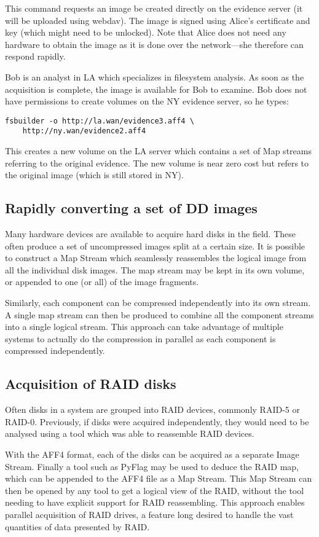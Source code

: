 \documentclass[10pt, conference]{IEEEtran}
\begin{document}
{{This command requests an image be created directly on the evidence
server (it will be uploaded using webdav). The image is signed using
Alice's certificate and key (which might need to be unlocked). Note
that Alice does not need any hardware to obtain the image as it is
done over the network---she therefore can respond rapidly.

Bob is an analyst in LA which specializes in filesystem analysis. As
soon as the acquisition is complete, the image is available for Bob to
examine. Bob does not have permissions to create volumes on the NY
evidence server, so he types:
\begin{lstlisting}
fsbuilder -o http://la.wan/evidence3.aff4 \
	http://ny.wan/evidence2.aff4
\end{lstlisting}
This creates a new volume on the LA server which contains a set of Map
streams referring to the original evidence. The new volume is near
zero cost but refers to the original image (which is still stored in
NY).

\subsection{Rapidly converting a set of DD images}
Many hardware devices are available to acquire hard disks in the
field. These often produce a set of uncompressed images split at a
certain size. It is possible to construct a Map Stream which
seamlessly reassembles the logical image from all the individual disk
images. The map stream may be kept in its own volume, or appended to
one (or all) of the image fragments.

Similarly, each component can be compressed independently into its own
stream. A single map stream can then be produced to combine all the
component streams into a single logical stream. This approach can take
advantage of multiple systems to actually do the compression in
parallel as each component is compressed independently.

\subsection{Acquisition of RAID disks}
Often disks in a system are grouped into RAID devices, commonly RAID-5
or RAID-0. Previously, if disks were acquired independently, they
would need to be analysed using a tool which was able to reassemble
RAID devices.

With the AFF4 format, each of the disks can be acquired as a separate
Image Stream. Finally a tool such as PyFlag \cite{pyflag_raid} may be
used to deduce the RAID map, which can be appended to the AFF4 file as
a Map Stream. This Map Stream can then be opened by any tool to get a
logical view of the RAID, without the tool needing to have explicit
support for RAID reassembling. This approach enables parallel
acquisition of RAID drives, a feature long desired to handle the vast
quantities of data presented by RAID.

}}
\end{document}
